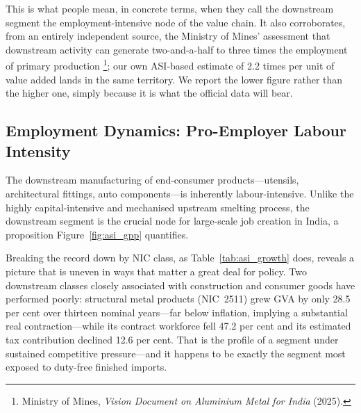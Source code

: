 \documentclass[11pt, a4paper]{article}
\numberwithin{figure}{section}
\numberwithin{table}{section}
\begin{document}
This is what people mean, in concrete terms, when they call the downstream segment the employment-intensive node of the value chain. It also corroborates, from an entirely independent source, the Ministry of Mines' assessment that downstream activity can generate two-and-a-half to three times the employment of primary production \cite{mom_vision2025}\footnote{Ministry of Mines, \textit{Vision Document on Aluminium Metal for India} (2025).}; our own ASI-based estimate of 2.2 times per unit of value added lands in the same territory. We report the lower figure rather than the higher one, simply because it is what the official data will bear.

\subsection{Employment Dynamics: Pro-Employer Labour Intensity}
The downstream manufacturing of end-consumer products---utensils, architectural fittings, auto components---is inherently labour-intensive. Unlike the highly capital-intensive and mechanised upstream smelting process, the downstream segment is the crucial node for large-scale job creation in India, a proposition Figure~\ref{fig:asi_gpp} quantifies.

Breaking the record down by NIC class, as Table~\ref{tab:asi_growth} does, reveals a picture that is uneven in ways that matter a great deal for policy. Two downstream classes closely associated with construction and consumer goods have performed poorly: structural metal products (NIC~2511) grew GVA by only 28.5 per cent over thirteen nominal years---far below inflation, implying a substantial real contraction---while its contract workforce fell 47.2 per cent and its estimated tax contribution declined 12.6 per cent. That is the profile of a segment under sustained competitive pressure---and it happens to be exactly the segment most exposed to duty-free finished imports.
\end{document}
